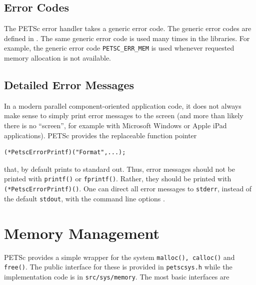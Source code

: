 \subsection{Error Codes}

The PETSc error handler takes a generic error code.
The generic error codes are defined in
\href{http://www.mcs.anl.gov/petsc/petsc-master/include/petscerror.h.html}{}. 
The same generic error code is used many times in the libraries. 
For example, the generic error code \lstinline{PETSC_ERR_MEM} is used whenever requested memory allocation is not available.

\subsection{Detailed Error Messages}
In a modern parallel component-oriented application code, it does not always make sense
to simply print error messages to the screen (and more than likely there is no
``screen'', for example with Microsoft Windows or Apple iPad applications).
PETSc provides the replaceable function pointer
\begin{lstlisting}
(*PetscErrorPrintf)("Format",...);
\end{lstlisting}
that, by default prints to standard out. Thus, error messages should not
be printed with \lstinline{printf()} or \lstinline{fprintf()}. 
Rather, they should be printed with
\lstinline{(*PetscErrorPrintf)()}. 
One can direct all error messages to \lstinline{stderr}, instead of the default \lstinline{stdout}, with the command line options .

\section{Memory Management}

PETSc provides a simple wrapper for the system \lstinline{malloc(), calloc()} and \lstinline{free()}. The public interface for these is provided in \lstinline{petscsys.h} while the implementation code is in \lstinline{src/sys/memory}. The most basic interfaces are

